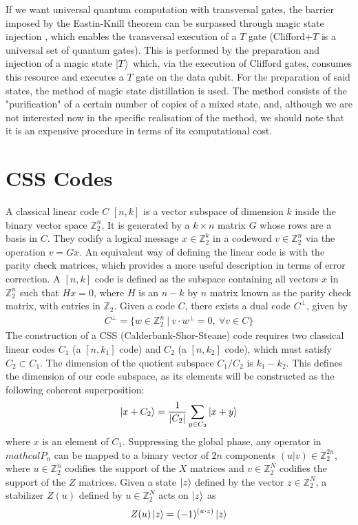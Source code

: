 \documentclass[12pt, twoside, openany]{book}
\begin{document}
If we want universal quantum computation with transversal gates, the barrier imposed by the Eastin-Knill theorem can be surpassed through magic state injection \cite{Bravyi_2005}, which enables the transversal execution of a $T$ gate (Clifford+$T$ is a universal set of quantum gates). This is performed by the preparation and injection of a magic state $\ket{T}$ which, via the execution of Clifford gates, consumes this resource and executes a $T$ gate on the data qubit. For the preparation of said states, the method of magic state distillation is used. The method consists of the "purification" of a certain number of copies of a mixed state, and, although we are not interested now in the specific realisation of the method, we should note that it is an expensive procedure in terms of its computational cost.

\section{CSS Codes}

A classical linear code $C$ $[n,k]$ is a vector subspace of dimension $k$ inside the binary vector space $\mathbb{Z}^n_2$. It is generated by a $k \times  n$ matrix $G$ whose rows are a basis in $C$. They codify a logical message $x \in \mathbb{Z}^k_2$ in a codeword $v \in \mathbb{Z}^n_2$ via the operation $v = G x$. An equivalent way of defining the linear code is with the parity check matrices, which provides a more useful description in terms of error correction. A $[n,k]$ code is defined as the subspace containing all vectors $x$ in $\mathbb{Z}^n_2$ such that $Hx = 0$, where $H$ is an $n-k$ by $n$ matrix known as the parity check matrix, with entries in $\mathbb{Z}_2$. Given a code $C$, there exists a dual code $C^\perp$, given by
\begin{align*}
    C^\perp = \{w \in \mathbb{Z}^n_2 \ | \ v \cdot w^\perp =0, \ \forall v \in C\}
\end{align*}
The construction of a CSS (Calderbank-Shor-Steane) code \cite{steane1996} requires two classical linear codes $C_1$ (a $[n, k_1]$ code) and $C_2$ (a $[n, k_2]$ code), which must satisfy $C_2 \subset C_1$. The dimension of the quotient subspace $C_1 / C_2$ is $k_1 - k_2$. This defines the dimension of our code subspace, as its elements will be constructed as the following coherent superposition:
\begin{align}
    \ket{x + C_2} = \frac{1}{|C_2|} \sum_{y \in C_2} \ket{x + y}
\end{align}
where $x$ is an element of $C_1$. Suppressing the global phase, any operator in $mathcal{P}_n$ can be mapped to a binary vector of $2n$ components $(u|v) \in \mathbb{Z}^{2n}_2$, where $u \in \mathbb{Z}^n_2$ codifies the support of the $X$ matrices and $v \in \mathbb{Z}^N_2$ codifies the support of the $Z$ matrices. Given a state $\ket{z}$ defined by the vector $z \in \mathbb{Z}^N_2$, a stabilizer $Z(u)$ defined by $u \in \mathbb{Z}^N_2$ acts on $\ket{z}$ as
\begin{align*}
    Z(u) \ket{z} = (-1)^{(u \cdot z)} \ket{z}
\end{align*}
\end{document}
